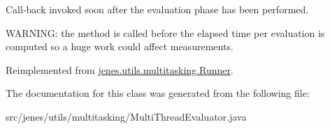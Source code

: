 Call-back invoked soon after the evaluation phase has been performed. \par
 WARNING: the method is called before the elapsed time per evaluation is computed so a huge work could affect measurements. 

Reimplemented from \hyperlink{classjenes_1_1utils_1_1multitasking_1_1_runner_82c84ad942296d62849248b107ec3a2c}{jenes.utils.multitasking.Runner}.

The documentation for this class was generated from the following file:\begin{CompactItemize}
\item 
src/jenes/utils/multitasking/MultiThreadEvaluator.java\end{CompactItemize}
